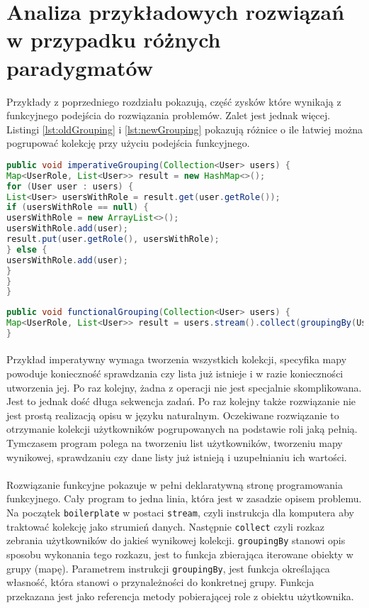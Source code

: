 \documentclass[a4paper,10pt]{report}
\begin{document}
\section{Analiza przykładowych rozwiązań w przypadku różnych paradygmatów}
Przykłady z poprzedniego rozdziału pokazują, część zysków które wynikają z funkcyjnego podejścia do rozwiązania problemów. Zalet jest jednak więcej. Listingi \ref{lst:oldGrouping}  i \ref{lst:newGrouping} pokazują różnice o ile łatwiej można pogrupować kolekcję przy użyciu podejścia funkcyjnego.
\begin{lstlisting}[caption={Grupowanie. Podejście imperatywne},label={lst:oldGrouping},language=Java]
public void imperativeGrouping(Collection<User> users) {
Map<UserRole, List<User>> result = new HashMap<>();
for (User user : users) {
List<User> usersWithRole = result.get(user.getRole());
if (usersWithRole == null) {
usersWithRole = new ArrayList<>();
usersWithRole.add(user);
result.put(user.getRole(), usersWithRole);
} else {
usersWithRole.add(user);
}
}
}
\end{lstlisting}
\begin{lstlisting}[caption={Grupowanie. Podejście funkcyjne},label={lst:newGrouping},language=Java]
public void functionalGrouping(Collection<User> users) {
Map<UserRole, List<User>> result = users.stream().collect(groupingBy(User::getRole));
}
\end{lstlisting}
\paragraph{}
Przykład imperatywny wymaga tworzenia wszystkich kolekcji, specyfika mapy powoduje konieczność sprawdzania czy lista już istnieje i w razie konieczności utworzenia jej. Po raz kolejny, żadna z operacji nie jest specjalnie skomplikowana. Jest to jednak dość długa sekwencja zadań. Po raz kolejny także rozwiązanie nie jest prostą realizacją opisu w języku naturalnym. Oczekiwane rozwiązanie to otrzymanie kolekcji użytkowników pogrupowanych na podstawie roli jaką pełnią. Tymczasem program polega na tworzeniu list użytkowników, tworzeniu mapy wynikowej, sprawdzaniu czy dane listy już istnieją i uzupełnianiu ich wartości. 
\paragraph{}
Rozwiązanie funkcyjne pokazuje w pełni deklaratywną stronę programowania funkcyjnego. Cały program to jedna linia, która jest w zasadzie opisem problemu. Na początek \verb|boilerplate| w postaci \verb|stream|, czyli instrukcja dla komputera aby traktować kolekcję jako strumień danych. Następnie \verb|collect| czyli rozkaz zebrania użytkowników do jakieś wynikowej kolekcji. \verb|groupingBy| stanowi opis sposobu wykonania tego rozkazu, jest to funkcja zbierająca iterowane obiekty w grupy (mapę). Parametrem instrukcji \verb|groupingBy|, jest funkcja określająca własność, która stanowi o przynależności do konkretnej grupy. Funkcja przekazana jest jako referencja metody pobierającej role z obiektu użytkownika.
\end{document}
